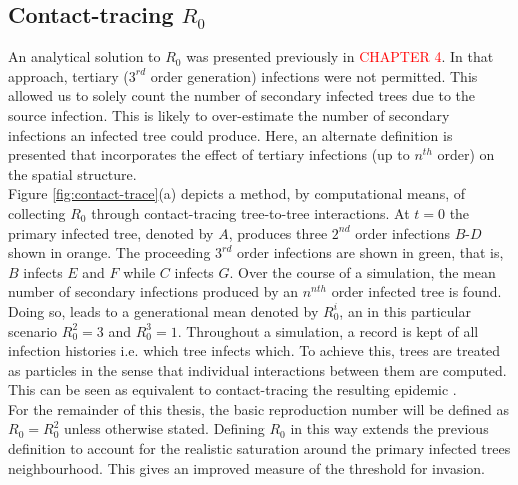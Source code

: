 \subsection{Contact-tracing $R_0$}

An analytical solution to $R_0$ was presented previously in \textcolor{red}{CHAPTER 4}. %
In that approach, tertiary ($3^{rd}$ order generation) infections were not permitted. %
This allowed us to solely count the number of secondary infected trees due to the source infection. %
This is likely to over-estimate the number of secondary infections an infected tree could produce. %
Here, an alternate definition is presented that incorporates the effect of tertiary infections %
(up to $n^{th}$ order)  on the spatial structure.\\

Figure \ref{fig:contact-trace}(a) depicts a method, by computational means, of collecting $R_0$ %
through contact-tracing tree-to-tree interactions. %
At $t=0$ the primary infected tree, denoted by $A$, produces three $2^{nd}$ order infections %
$B$-$D$ shown in orange. %
The proceeding $3^{rd}$ order infections are shown in green, that is, $B$ infects $E$ and $F$ while $C$ infects $G$. %
Over the course of a simulation, the mean number of secondary infections produced by an $n^{nth}$ order infected tree is found. %
Doing so, leads to a generational mean denoted by $R^i_0$, an in this particular scenario $R^2_0=3$ and $R^3_0=1$. 
Throughout a simulation, a record is kept of all infection histories i.e. which tree infects which. 
To achieve this, trees are treated as particles in the sense that individual interactions between them are computed. 
This can be seen as equivalent to contact-tracing the resulting epidemic \cite{eames2003contact}. \\

For the remainder of this thesis, the basic reproduction number will be defined as $R_0=R^2_0$ unless otherwise stated. 
Defining $R_0$ in this way extends the previous definition to account for the realistic %
saturation around the primary infected trees neighbourhood. This gives an improved measure %
of the threshold for invasion.\\

